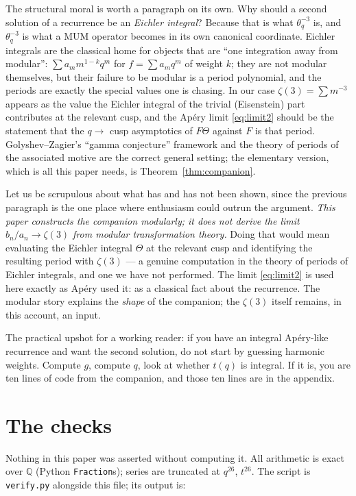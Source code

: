 \documentclass[11pt,reqno]{amsart}
\theoremstyle{plain}
\theoremstyle{definition}
\theoremstyle{remark}
\newcommand{\Q}{\mathbb{Q}}
\newcommand{\tq}{\theta_q}
\numberwithin{equation}{section}
\begin{document}
The structural moral is worth a paragraph on its own. Why should a second
solution of a recurrence be an \emph{Eichler integral}? Because that is what
$\tq^{-3}$ is, and $\tq^{-3}$ is what a MUM operator becomes in its own
canonical coordinate. Eichler integrals are the classical home for objects that
are ``one integration away from modular'': $\sum a_mm^{1-k}q^m$ for $f=\sum
a_mq^m$ of weight $k$; they are not modular themselves, but their failure to be
modular is a period polynomial, and the periods are exactly the special values
one is chasing. In our case $\zeta(3)=\sum m^{-3}$ appears as the value the
Eichler integral of the trivial (Eisenstein) part contributes at the relevant
cusp, and the Ap\'ery limit \eqref{eq:limit2} should be the statement that the
$q\to$ cusp asymptotics of $F\Theta$ against $F$ is that period.
Golyshev--Zagier's ``gamma conjecture'' framework \cite{Golyshev} and the theory
of periods of the associated motive are the correct general setting; the
elementary version, which is all this paper needs, is Theorem~\ref{thm:companion}.

Let us be scrupulous about what has and has not been shown, since the previous
paragraph is the one place where enthusiasm could outrun the argument.
\emph{This paper constructs the companion modularly; it does not derive the
limit $b_n/a_n\to\zeta(3)$ from modular transformation theory.} Doing that would
mean evaluating the Eichler integral $\Theta$ at the relevant cusp and
identifying the resulting period with $\zeta(3)$ --- a genuine computation in
the theory of periods of Eichler integrals, and one we have not performed. The
limit \eqref{eq:limit2} is used here exactly as Ap\'ery used it: as a classical
fact about the recurrence. The modular story explains the \emph{shape} of the
companion; the $\zeta(3)$ itself remains, in this account, an input.

The practical upshot for a working reader: if you have an integral
Ap\'ery-like recurrence and want the second solution, do not start by guessing
harmonic weights. Compute $g$, compute $q$, look at whether $t(q)$ is integral.
If it is, you are ten lines of code from the companion, and those ten lines are
in the appendix.

\section{The checks}\label{sec:checks}

Nothing in this paper was asserted without computing it. All arithmetic is
exact over $\Q$ (Python \texttt{Fraction}s); series are truncated at $q^{26}$,
$t^{26}$. The script is \texttt{verify.py} alongside this file; its output is:
\end{document}
